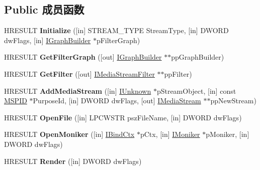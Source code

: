 \subsection*{Public 成员函数}
\begin{DoxyCompactItemize}
\item 
\mbox{\label{interface_i_a_m_multi_media_stream_a94964d61c73471eb2c643a127f436473}} 
H\+R\+E\+S\+U\+LT {\bfseries Initialize} (\mbox{[}in\mbox{]} S\+T\+R\+E\+A\+M\+\_\+\+T\+Y\+PE Stream\+Type, \mbox{[}in\mbox{]} D\+W\+O\+RD dw\+Flags, \mbox{[}in\mbox{]} \hyperlink{interface_i_graph_builder}{I\+Graph\+Builder} $\ast$p\+Filter\+Graph)
\item 
\mbox{\label{interface_i_a_m_multi_media_stream_af5b5d7c0b4c46d2e4a5f4c42194226f2}} 
H\+R\+E\+S\+U\+LT {\bfseries Get\+Filter\+Graph} (\mbox{[}out\mbox{]} \hyperlink{interface_i_graph_builder}{I\+Graph\+Builder} $\ast$$\ast$pp\+Graph\+Builder)
\item 
\mbox{\label{interface_i_a_m_multi_media_stream_aaec9984acc241dac13a9dd19d730f584}} 
H\+R\+E\+S\+U\+LT {\bfseries Get\+Filter} (\mbox{[}out\mbox{]} \hyperlink{interface_i_media_stream_filter}{I\+Media\+Stream\+Filter} $\ast$$\ast$pp\+Filter)
\item 
\mbox{\label{interface_i_a_m_multi_media_stream_acd850667749dbd80b00fca1d49ad102d}} 
H\+R\+E\+S\+U\+LT {\bfseries Add\+Media\+Stream} (\mbox{[}in\mbox{]} \hyperlink{interface_i_unknown}{I\+Unknown} $\ast$p\+Stream\+Object, \mbox{[}in\mbox{]} const \hyperlink{interface_g_u_i_d}{M\+S\+P\+ID} $\ast$Purpose\+Id, \mbox{[}in\mbox{]} D\+W\+O\+RD dw\+Flags, \mbox{[}out\mbox{]} \hyperlink{interface_i_media_stream}{I\+Media\+Stream} $\ast$$\ast$pp\+New\+Stream)
\item 
\mbox{\label{interface_i_a_m_multi_media_stream_ac451aad79d66a3463d98b8a113492e90}} 
H\+R\+E\+S\+U\+LT {\bfseries Open\+File} (\mbox{[}in\mbox{]} L\+P\+C\+W\+S\+TR psz\+File\+Name, \mbox{[}in\mbox{]} D\+W\+O\+RD dw\+Flags)
\item 
\mbox{\label{interface_i_a_m_multi_media_stream_a0f1824d870f43716a7934927b5e424be}} 
H\+R\+E\+S\+U\+LT {\bfseries Open\+Moniker} (\mbox{[}in\mbox{]} \hyperlink{interface_i_bind_ctx}{I\+Bind\+Ctx} $\ast$p\+Ctx, \mbox{[}in\mbox{]} \hyperlink{interface_i_moniker}{I\+Moniker} $\ast$p\+Moniker, \mbox{[}in\mbox{]} D\+W\+O\+RD dw\+Flags)
\item 
\mbox{\label{interface_i_a_m_multi_media_stream_ac66cc00dcaa8d80c2420ccb7af394191}} 
H\+R\+E\+S\+U\+LT {\bfseries Render} (\mbox{[}in\mbox{]} D\+W\+O\+RD dw\+Flags)
\end{DoxyCompactItemize}
